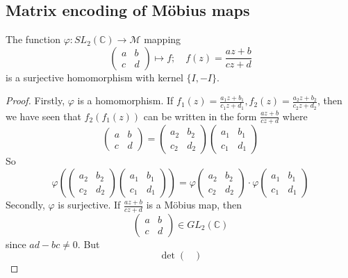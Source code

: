 \subsection{Matrix encoding of M\"obius maps}
\begin{proposition}
	The function \(\varphi\colon SL_2(\mathbb C) \to \mathcal M\) mapping
	\[
		\begin{pmatrix}
			a & b \\ c & d
		\end{pmatrix} \mapsto f;\quad f(z) = \frac{az + b}{cz + d}
	\]
	is a surjective homomorphism with kernel \(\{ I, -I \}\).
\end{proposition}
\begin{proof}
	Firstly, \(\varphi\) is a homomorphism.
	If \(f_1(z) = \frac{a_1z+b_1}{c_1z+d_1}, f_2(z) = \frac{a_2z+b_2}{c_2z+d_2}\), then we have seen that \(f_2(f_1(z))\) can be written in the form \(\frac{az+b}{cz+d}\) where
	\[
		\begin{pmatrix}
			a & b \\ c & d
		\end{pmatrix} = \begin{pmatrix}
			a_2 & b_2 \\ c_2 & d_2
		\end{pmatrix}\begin{pmatrix}
			a_1 & b_1 \\ c_1 & d_1
		\end{pmatrix}
	\]
	So
	\[
		\varphi\left( \begin{pmatrix}
				a_2 & b_2 \\ c_2 & d_2
			\end{pmatrix}\begin{pmatrix}
				a_1 & b_1 \\ c_1 & d_1
			\end{pmatrix} \right) = \varphi \begin{pmatrix}
			a_2 & b_2 \\ c_2 & d_2
		\end{pmatrix} \cdot \varphi \begin{pmatrix}
			a_1 & b_1 \\ c_1 & d_1
		\end{pmatrix}
	\]
	Secondly, \(\varphi\) is surjective.
	If \(\frac{az+b}{cz+d}\) is a M\"obius map, then
	\[
		\begin{pmatrix}
			a & b \\ c & d
		\end{pmatrix} \in GL_2(\mathbb C)
	\]
	since \(ad-bc\neq 0\).
	But
	\[
		\det \begin{pmatrix}

\end{pmatrix}\]
\end{proof}
